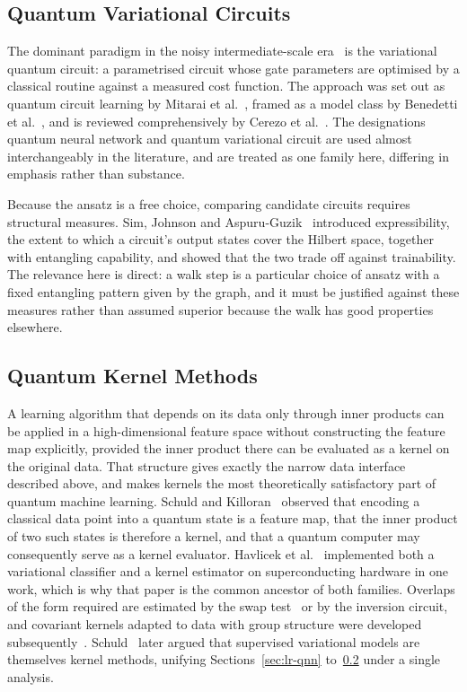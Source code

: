 \subsection{Quantum Variational Circuits}
The dominant paradigm in the noisy intermediate-scale era~\cite{Preskill_2018}
is the variational quantum circuit: a parametrised circuit whose gate parameters
are optimised by a classical routine against a measured cost function. The
approach was set out as quantum circuit learning by Mitarai et
al.~\cite{Mitarai_2018}, framed as a model class by Benedetti et
al.~\cite{Benedetti_2019}, and is reviewed comprehensively by Cerezo et
al.~\cite{Cerezo_2021}. The designations quantum neural network and quantum
variational circuit are used almost interchangeably in the literature, and are
treated as one family here, differing in emphasis rather than substance.

Because the ansatz is a free choice, comparing candidate circuits requires
structural measures. Sim, Johnson and Aspuru-Guzik~\cite{Sim_2019} introduced
expressibility, the extent to which a circuit's output states cover the Hilbert
space, together with entangling capability, and showed that the two trade off
against trainability. The relevance here is direct: a walk step is a particular
choice of ansatz with a fixed entangling pattern given by the graph, and it must
be justified against these measures rather than assumed superior because the
walk has good properties elsewhere.

\subsection{Quantum Kernel Methods}
\label{sec:lr-qkernel}
A learning algorithm that depends on its data only through inner products can be
applied in a high-dimensional feature space without constructing the feature map
explicitly, provided the inner product there can be evaluated as a kernel on the
original data. That structure gives exactly the narrow data interface described
above, and makes kernels the most theoretically satisfactory part of quantum
machine learning. Schuld and Killoran~\cite{Schuld_2018} observed that encoding
a classical data point into a quantum state is a feature map, that the inner
product of two such states is therefore a kernel, and that a quantum computer
may consequently serve as a kernel evaluator. Havlicek et
al.~\cite{Havlicek_2019} implemented both a variational classifier and a kernel
estimator on superconducting hardware in one work, which is why that paper is
the common ancestor of both families. Overlaps of the form required are
estimated by the swap test~\cite{Buhrman_2001} or by the inversion circuit, and
covariant kernels adapted to data with group structure were developed
subsequently~\cite{Glick_2021}. Schuld~\cite{Schuld_2021} later argued that
supervised variational models are themselves kernel methods, unifying
Sections~\ref{sec:lr-qnn} to~\ref{sec:lr-qkernel} under a single analysis.


